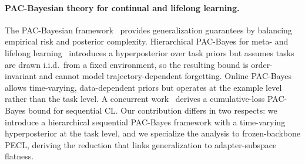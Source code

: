 \paragraph{PAC-Bayesian theory for continual and lifelong learning.}
The PAC-Bayesian framework~\citep{mcallesterPACBayesianModelAveraging1999,mcallesterPACBayesianStochasticModel2003} provides generalization guarantees by balancing empirical risk and posterior complexity.
Hierarchical PAC-Bayes for meta- and lifelong learning~\citep{pentinaPACBayesianBoundLifelong2014,JMLR:v24:22-1254} introduces a hyperposterior over task priors but assumes tasks are drawn i.i.d.\ from a fixed environment, so the resulting bound is order-invariant and cannot model trajectory-dependent forgetting.
Online PAC-Bayes~\citep{NEURIPS2022_onlineBayes,NEURIPS2024_xinrui} allows time-varying, data-dependent priors but operates at the example level rather than the task level.
A concurrent work~\citep{friedman2026pac} derives a cumulative-loss PAC-Bayes bound for sequential CL.
Our contribution differs in two respects: we introduce a hierarchical sequential PAC-Bayes framework with a time-varying hyperposterior at the task level, and we specialize the analysis to frozen-backbone PECL, deriving the reduction that links generalization to adapter-subspace flatness.
